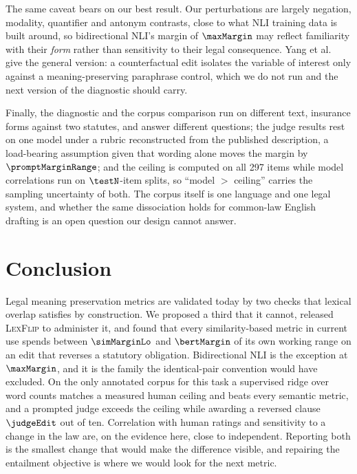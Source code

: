 \documentclass{BVP_JCLLT}
\begin{document}
The same caveat bears on our best result. Our perturbations are largely
negation, modality, quantifier and antonym contrasts, close to what NLI training
data is built around, so bidirectional NLI's margin of $\maxMargin$ may reflect
familiarity with their \emph{form} rather than sensitivity to their legal
consequence. Yang et al.\ \cite{yang2026compared} give the general version: a
counterfactual edit isolates the variable of interest only against a
meaning-preserving paraphrase control, which we do not run and the next version
of the diagnostic should carry.

Finally, the diagnostic and the corpus comparison run on different text,
insurance forms against two statutes, and answer different questions; the judge
results rest on one model under a rubric reconstructed from the published
description, a load-bearing assumption given that wording alone moves the margin
by $\promptMarginRange$; and the ceiling is computed on all 297 items while model
correlations run on $\testN$-item splits, so ``model $>$ ceiling'' carries the
sampling uncertainty of both. The corpus itself is one language and one legal
system, and whether the same dissociation holds for common-law English drafting
is an open question our design cannot answer.

\section{Conclusion}\label{sec:conclusion}

Legal meaning preservation metrics are validated today by two checks that
lexical overlap satisfies by construction. We proposed a third that it cannot,
released \textsc{LexFlip} to administer it, and found that every similarity-based
metric in current use spends between $\simMarginLo$ and $\bertMargin$ of its own
working range on an edit that reverses a statutory obligation. Bidirectional NLI
is the exception at $\maxMargin$, and it is the family the identical-pair
convention would have excluded. On the only annotated corpus for this task a
supervised ridge over word counts matches a measured human ceiling and beats
every semantic metric, and a prompted judge exceeds the ceiling while awarding a
reversed clause $\judgeEdit$ out of ten. Correlation with human ratings and
sensitivity to a change in the law are, on the evidence here, close to
independent. Reporting both is the smallest change that would make the
difference visible, and repairing the entailment objective is where we would
look for the next metric.
\end{document}

